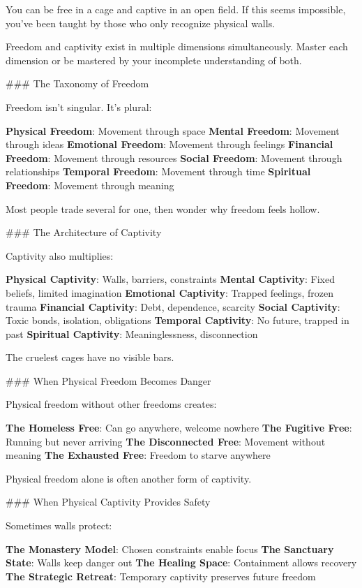 \documentclass[12pt]{book}
\begin{document}
You can be free in a cage and captive in an open field. If this seems impossible, you've been taught by those who only recognize physical walls.

Freedom and captivity exist in multiple dimensions simultaneously. Master each dimension or be mastered by your incomplete understanding of both.

\#\#\# The Taxonomy of Freedom

Freedom isn't singular. It's plural:

\textbf{Physical Freedom}: Movement through space
\textbf{Mental Freedom}: Movement through ideas
\textbf{Emotional Freedom}: Movement through feelings
\textbf{Financial Freedom}: Movement through resources
\textbf{Social Freedom}: Movement through relationships
\textbf{Temporal Freedom}: Movement through time
\textbf{Spiritual Freedom}: Movement through meaning

Most people trade several for one, then wonder why freedom feels hollow.

\#\#\# The Architecture of Captivity

Captivity also multiplies:

\textbf{Physical Captivity}: Walls, barriers, constraints
\textbf{Mental Captivity}: Fixed beliefs, limited imagination
\textbf{Emotional Captivity}: Trapped feelings, frozen trauma
\textbf{Financial Captivity}: Debt, dependence, scarcity
\textbf{Social Captivity}: Toxic bonds, isolation, obligations
\textbf{Temporal Captivity}: No future, trapped in past
\textbf{Spiritual Captivity}: Meaninglessness, disconnection

The cruelest cages have no visible bars.

\#\#\# When Physical Freedom Becomes Danger

Physical freedom without other freedoms creates:

\textbf{The Homeless Free}: Can go anywhere, welcome nowhere
\textbf{The Fugitive Free}: Running but never arriving
\textbf{The Disconnected Free}: Movement without meaning
\textbf{The Exhausted Free}: Freedom to starve anywhere

Physical freedom alone is often another form of captivity.

\#\#\# When Physical Captivity Provides Safety

Sometimes walls protect:

\textbf{The Monastery Model}: Chosen constraints enable focus
\textbf{The Sanctuary State}: Walls keep danger out
\textbf{The Healing Space}: Containment allows recovery
\textbf{The Strategic Retreat}: Temporary captivity preserves future freedom
\end{document}
